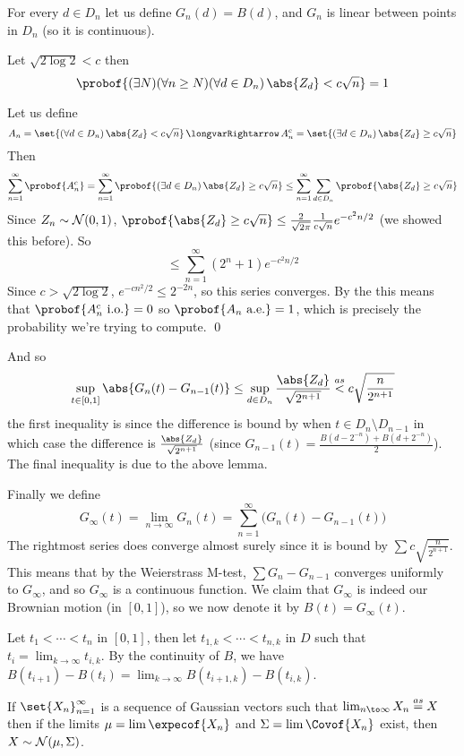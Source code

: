 For every $d\in D_n$ let us define $G_n(d)=B(d)$, and $G_n$ is linear between points in $D_n$ (so it is continuous).

\blemm

    Let $\sqrt{2\log 2}<c$ then
    $$ \probof{(\exists N)(\forall n\geq N)(\forall d\in D_n)\,\abs{Z_d}<c\sqrt n} = 1 $$

\elemm

Let us define
$$ A_n = \set{(\forall d\in D_n)\, \abs{Z_d}<c\sqrt n}\implies A_n^c = \set{(\exists d\in D_n)\, \abs{Z_d}\geq c\sqrt n} $$
Then
$$ \sum_{n=1}^\infty \probof{A_n^c} = \sum_{n=1}^\infty \probof{(\exists d\in D_n)\, \abs{Z_d}\geq c\sqrt n} \leq \sum_{n=1}^\infty\sum_{d\in D_n}\probof{\abs{Z_d}\geq c\sqrt n} $$
Since $Z_n\sim{\cal N}(0,1)$, $\probof{\abs{Z_d}\geq c\sqrt n}\leq\frac2{\sqrt{2\pi}}\frac1{c\sqrt n}e^{-c^2n/2}$ (we showed this before).
So
$$ \leq \sum_{n=1}^\infty(2^n+1)e^{-c^2n/2} $$
Since $c>\sqrt{2\log2}$, $e^{-cn^2/2}\leq 2^{-2n}$, so this series converges.
By the  this means that $\probof{A_n^c\hbox{ i.o.}}=0$ so $\probof{A_n\hbox{ a.e.}}=1$, which is precisely the probability we're trying to compute.
\qed

And so
$$ \sup_{t\in[0,1]}\abs{G_n(t)-G_{n-1}(t)} \leq \sup_{d\in D_n}\frac{\abs{Z_d}}{\sqrt{2^{n+1}}} \buildrel as\over< c\sqrt{\frac n{2^{n+1}}} $$
the first inequality is since the difference is bound by when $t\in D_n\setminus D_{n-1}$ in which case the difference is $\frac{\abs{Z_d}}{\sqrt{2^{n+1}}}$ (since
$G_{n-1}(t)=\frac{B(d-2^{-n})+B(d+2^{-n})}2$).
The final inequality is due to the above lemma.

Finally we define
$$ G_\infty(t) = \lim_{n\to\infty}G_n(t) = \sum_{n=1}^\infty\bigl(G_n(t) - G_{n-1}(t)\bigr) $$
The rightmost series does converge almost surely since it is bound by $\sum c\sqrt{\frac n{2^{n+1}}}$.
This means that by the Weierstrass M-test, $\sum G_n-G_{n-1}$ converges uniformly to $G_\infty$, and so $G_\infty$ is a continuous function.
We claim that $G_\infty$ is indeed our Brownian motion (in $[0,1]$), so we now denote it by $B(t)=G_\infty(t)$.

Let $t_1<\cdots<t_n$ in $[0,1]$, then let $t_{1,k}<\cdots<t_{n,k}$ in $D$ such that $t_i=\lim_{k\to\infty}t_{i,k}$.
By the continuity of $B$, we have $B(t_{i+1})-B(t_i)=\lim_{k\to\infty}B(t_{i+1,k})-B(t_{i,k})$.

\bprop

    If $\set{X_n}_{n=1}^\infty$ is a sequence of Gaussian vectors such that $\lim_{n\to\infty}X_n\buildrel as\over=X$ then if the limits $\mu=\lim\expecof{X_n}$ and $\Sigma=\lim\Covof{X_n}$ exist, then
    $X\sim{\cal N}(\mu,\Sigma)$.

